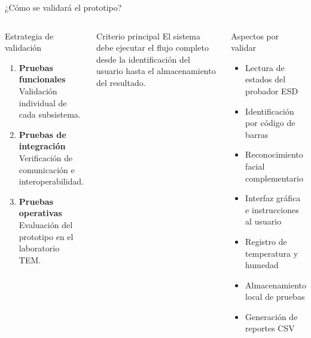 \documentclass[aspectratio=169]{beamer}
\begin{document}
\begin{frame}{¿Cómo se validará el prototipo?}

\small

\begin{columns}[T]


    \begin{block}{Estrategia de validación}
        \begin{enumerate}
            \item \textbf{Pruebas funcionales}\\
            Validación individual de cada subsistema.

            \item \textbf{Pruebas de integración}\\
            Verificación de comunicación e interoperabilidad.

            \item \textbf{Pruebas operativas}\\
            Evaluación del prototipo en el laboratorio TEM.
        \end{enumerate}
    \end{block}

    \vspace{0.15cm}

    \begin{alertblock}{Criterio principal}
        El sistema debe ejecutar el flujo completo desde la identificación del usuario hasta el almacenamiento del resultado.
    \end{alertblock}


    \begin{block}{Aspectos por validar}
        \begin{itemize}
            \item Lectura de estados del probador ESD
            \item Identificación por código de barras
            \item Reconocimiento facial complementario
            \item Interfaz gráfica e instrucciones al usuario
            \item Registro de temperatura y humedad
            \item Almacenamiento local de pruebas
            \item Generación de reportes CSV
        \end{itemize}
    \end{block}

\end{columns}

\end{frame}
\end{document}
